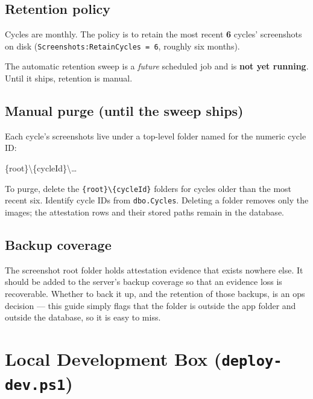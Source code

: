 \documentclass[12pt,a4paper]{report}
\begin{document}
\section{Retention policy}

Cycles are monthly. The policy is to retain the most recent \textbf{6} cycles' screenshots on disk
(\texttt{Screenshots:RetainCycles = 6}, roughly six months).

\begin{warnbox}
The automatic retention sweep is a \emph{future} scheduled job and is \textbf{not yet running}.
Until it ships, retention is manual.
\end{warnbox}

\section{Manual purge (until the sweep ships)}

Each cycle's screenshots live under a top-level folder named for the numeric cycle ID:

\begin{codebox}
\ttfamily \{root\}\textbackslash\{cycleId\}\textbackslash\ldots
\end{codebox}

To purge, delete the \texttt{\{root\}\textbackslash\{cycleId\}} folders for cycles older than the
most recent six. Identify cycle IDs from \texttt{dbo.Cycles}. Deleting a folder removes only the
images; the attestation rows and their stored paths remain in the database.

\section{Backup coverage}

The screenshot root folder holds attestation evidence that exists nowhere else. It should be added
to the server's backup coverage so that an evidence loss is recoverable. Whether to back it up, and
the retention of those backups, is an ops decision --- this guide simply flags that the folder is
outside the app folder and outside the database, so it is easy to miss.

\chapter{Local Development Box (\texttt{deploy-dev.ps1})}
\label{ch:devbox}
\end{document}
